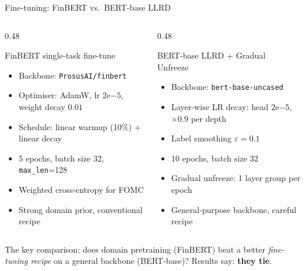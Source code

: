\documentclass[10pt, aspectratio=169]{beamer}
\begin{document}
\begin{frame}{Fine-tuning: FinBERT vs.\ BERT-base LLRD}
    \begin{columns}[T]
        \begin{column}{0.48\textwidth}
            \begin{block}{FinBERT single-task fine-tune}
                \begin{itemize}\setlength{\itemsep}{1pt}
                    \item Backbone: \texttt{ProsusAI/finbert}
                    \item Optimiser: AdamW, lr $2\mathrm{e}{-5}$, weight decay $0.01$
                    \item Schedule: linear warmup (10\%) + linear decay
                    \item 5 epochs, batch size 32, \texttt{max\_len}=128
                    \item Weighted cross-entropy for FOMC
                    \item Strong domain prior, conventional recipe
                \end{itemize}
            \end{block}
        \end{column}
        \begin{column}{0.48\textwidth}
            \begin{block}{BERT-base LLRD + Gradual Unfreeze~\cite{howard2018ulmfit,sun2019finetune}}
                \begin{itemize}\setlength{\itemsep}{1pt}
                    \item Backbone: \texttt{bert-base-uncased}
                    \item Layer-wise LR decay: head $2\mathrm{e}{-5}$, $\times 0.9$ per depth
                    \item Label smoothing $\varepsilon = 0.1$
                    \item 10 epochs, batch size 32
                    \item Gradual unfreeze: 1 layer group per epoch
                    \item General-purpose backbone, careful recipe
                \end{itemize}
            \end{block}
        \end{column}
    \end{columns}

    \vspace{0.3em}
    {\small The key comparison: does domain pretraining (FinBERT) beat a better \textit{fine-tuning recipe} on a general backbone (BERT-base)? Results say: \textbf{they tie}.}
\end{frame}
\end{document}
